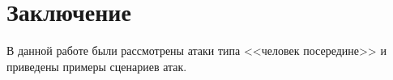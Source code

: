 \section*{Заключение}

В данной работе были рассмотрены атаки типа <<человек посередине>> и приведены примеры сценариев атак.